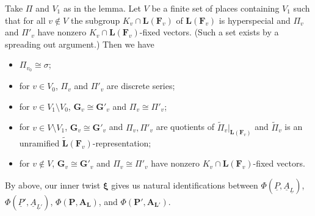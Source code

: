 \documentclass[a4paper]{amsart}
\numberwithin{equation}{section}
\theoremstyle{remark}
\theoremstyle{definition}
\newcommand{\alggrp}[1]{\underline{#1}}
\newcommand{\glob}[1]{\boldsymbol{#1}}
\renewcommand{\simeq}{\cong}
\begin{document}
Take $\Pi$ and $V_{1}$ as in the lemma.
Let $V$ be a finite set of places containing $V_{1}$ such that for all $v\notin V$ the subgroup $K_{v}\cap \glob{L}(\glob{F}_{v})$ of $\glob{L}(\glob{F}_{v})$ is hyperspecial and $\Pi_{v}$ and $\Pi'_{v}$ have nonzero $K_{v}\cap \glob{L}(\glob{F}_{v})$-fixed vectors.
(Such a set exists by a spreading out argument.)
Then we have
\begin{itemize}
\item $\Pi_{v_{0}}\simeq \sigma$;
\item for $v\in V_{0}$, $\Pi_{v}$ and $\Pi'_{v}$ are discrete series;
\item for $v\in V_{1}\setminus V_{0}$, $\glob{G}_{v}\simeq \glob{G}'_{v}$ and $\Pi_{v}\simeq \Pi'_{v}$;
\item for $v\in V\setminus V_{1}$, $\glob{G}_{v}\simeq \glob{G}'_{v}$ and $\Pi_{v},\Pi'_{v}$ are quotients of $\widetilde{\Pi}_{v}|_{\glob{L}(\glob{F}_{v})}$ and $\widetilde{\Pi}_{v}$ is an unramified $\widetilde{\glob{L}}(\glob{F}_{v})$-representation;
\item for $v\notin V$, $\glob{G}_{v}\simeq \glob{G}'_{v}$ and $\Pi_{v}\simeq \Pi'_{v}$ have nonzero $K_{v}\cap \glob{L}(\glob{F}_{v})$-fixed vectors. \end{itemize}

By above, our inner twist $\glob{\xi}$ gives us natural identifications between $\Phi(\alggrp{P},\alggrp{A}_{\alggrp{L}})$, $\Phi(\alggrp{P}',\alggrp{A}_{\alggrp{L}'})$, $\Phi(\glob{P},\glob{A}_{\glob{L}})$, and $\Phi(\glob{P}',\glob{A}_{\glob{L}'})$.
\end{document}
